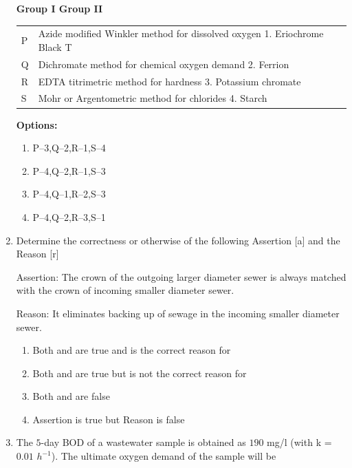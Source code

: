 \documentclass[journal]{IEEEtran}
\begin{document}
\begin{enumerate}
\textbf{Group I \hfill Group II}

\begin{tabular}{ll}
P & Azide modified Winkler method for dissolved oxygen \hfill 1. Eriochrome Black T \\
Q & Dichromate method for chemical oxygen demand \hfill 2. Ferrion \\
R & EDTA titrimetric method for hardness \hfill 3. Potassium chromate \\
S & Mohr or Argentometric method for chlorides \hfill 4. Starch \\
\end{tabular}


\textbf{Options:}
\begin{enumerate}
  \item P--3,\quad Q--2,\quad R--1,\quad S--4
  \item P--4,\quad Q--2,\quad R--1,\quad S--3
  \item P--4,\quad Q--1,\quad R--2,\quad S--3
  \item P--4,\quad Q--2,\quad R--3,\quad S--1
\end{enumerate}


\item Determine the correctness or otherwise of the following Assertion [a] and the Reason [r]


Assertion: The crown of the outgoing larger diameter sewer is always matched with the crown of
incoming smaller diameter sewer.


Reason: It eliminates backing up of sewage in the incoming smaller diameter sewer. \hfill {}

\begin{enumerate}
\item Both  and  are true and  is the correct reason for 
\item Both  and  are true but  is not the correct reason for 
\item Both  and  are false 
\item Assertion  is true but Reason is false 
\end{enumerate}     

\item The $5$-day BOD of a wastewater sample is obtained as $190$ mg/l (with k = $0.01$  $h^{-1}$). The ultimate oxygen demand  of the sample will be \hfill {}


\end{enumerate}
\end{document}
